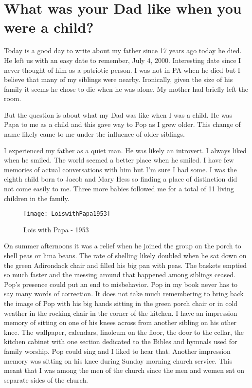 \section{What was your Dad like when you were a child?}

Today is a good day to write about my father since 17 years ago today he died.
He left us with an easy date to remember, July 4, 2000.
Interesting date since I never thought of him as a patriotic person.
I was not in PA when he died but I believe that many of my siblings were nearby.
Ironically, given the size of his family it seems he chose to die when he was alone.
My mother had briefly left the room.

But the question is about what my Dad was like when I was a child.
He was Papa to me as a child and this gave way to Pop as I grew older.
This change of name likely came to me under the influence of older siblings.

I experienced my father as a quiet man.
He was likely an introvert.
I always liked when he smiled.
The world seemed a better place when he smiled.
I have few memories of actual conversations with him but I'm sure I had some.
I was the eighth child born to Jacob and Mary Hess so finding a place of distinction did not come easily to me.
Three more babies followed me for a total of 11 living children in the family.
\begin{figure}
\centering
\texttt{[image: LoiswithPapa1953]}
\caption{Lois with Papa - 1953}
\end{figure}

On summer afternoons it was a relief when he joined the group on the porch to shell peas or lima beans.
The rate of shelling likely doubled when he sat down on the green Adirondack chair and filled his big pan with peas.
The baskets emptied so much faster and the messing around that happened among siblings ceased.
Pop's presence could put an end to misbehavior.
Pop in my book never has to say many words of correction.
It does not take much remembering to bring back the image of Pop with his big hands sitting in the green porch chair or in cold weather in the rocking chair in the corner of the kitchen.
I have an impression memory of sitting on one of his knees across from another sibling on his other knee.
The wallpaper, calendars, linoleum on the floor, the door to the cellar, the kitchen cabinet with one section dedicated to the Bibles and hymnals used for family worship.
Pop could sing and I liked to hear that.
Another impression memory was sitting on his knee during Sunday morning church service.
This meant that I was among the men of the church since the men and women sat on separate sides of the church.

